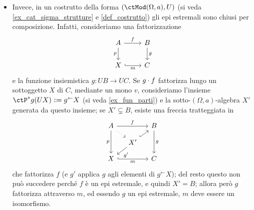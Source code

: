 \begin{remark}
\begin{itemize}
  \item Invece, in un costrutto della forma \((\ctMod(\Omega,a),U)\) (si veda \ref{ex_cat_sigma_strutture} e \ref{def_costrutto}) gli epi estremali sono chiusi per composizione. Infatti, consideriamo una fattorizzazione
        \[\begin{tikzcd}
          A & B \\
          X & C
          \arrow["f", from=1-1, to=1-2]
          \arrow["p"', from=1-1, to=2-1]
          \arrow["g", from=1-2, to=2-2]
          \arrow["m"', hook, from=2-1, to=2-2]
         \end{tikzcd}\]
        e la funzione insiemistica \(g \colon UB\to UC\). Se \(g\cdot f\) fattorizza lungo un sottoggetto \(X\) di \(C\), mediante un mono \(v\), consideriamo l'insieme \(\ctP^*g(UX) \defeq  g^\leftarrow X\) (si veda \ref{ex_fun_parti}) e la sotto-\((\Omega,a)\)-algebra \(X'\) generata da questo insieme; se \(X'\subsetneq B\), esiste una freccia tratteggiata in
        \[\begin{tikzcd}[sep=small]
          A && B \\
          & X' \\
          X && C
          \arrow["f", from=1-1, to=1-3]
          \arrow[dotted, from=1-1, to=2-2]
          \arrow["p"', from=1-1, to=3-1]
          \arrow["g", from=1-3, to=3-3]
          \arrow[hook, from=2-2, to=1-3]
          \arrow["g'", from=2-2, to=3-1]
          \arrow["m"', hook, from=3-1, to=3-3]
         \end{tikzcd}\]
        che fattorizza \(f\) (e \(g'\) applica \(g\) agli elementi di \(g^\leftarrow X\)); del resto questo non può succedere perché \(f\) è un epi estremale, e quindi \(X' = B\); allora però \(g\) fattorizza attraverso \(m\), ed essendo \(g\) un epi estremale, \(m\) deve essere un isomorfismo.
 \end{itemize}
\end{remark}
